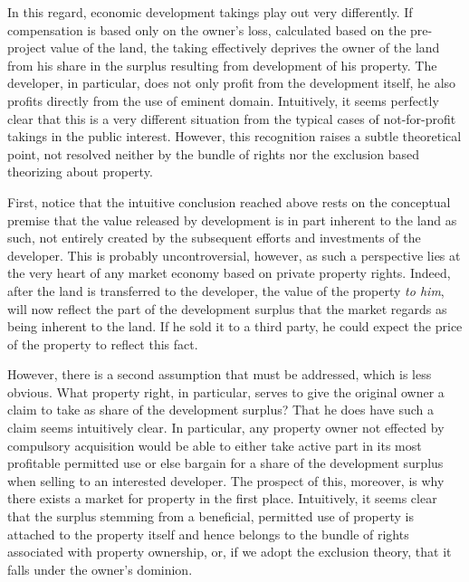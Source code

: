 In this regard, economic development takings play out very differently. If compensation is based only on the owner's loss, calculated based on the pre-project value of the land, the taking effectively deprives the owner of the land from his share in the surplus resulting from development of his property. The developer, in particular, does not only profit from the development itself, he also profits directly from the use of eminent domain. Intuitively, it seems perfectly clear that this is a very different situation from the typical cases of not-for-profit takings in the public interest. However, this recognition raises a subtle theoretical point, not resolved neither by the bundle of rights nor the exclusion based theorizing about property. 

First, notice that the intuitive conclusion reached above rests on the conceptual premise that the value released by development is in part inherent to the land as such, not entirely created by the subsequent efforts and investments of the developer. This is probably  uncontroversial, however, as such a perspective lies at the very heart of any market economy based on private property rights. Indeed, after the land is transferred to the developer, the value of the property {\it to him}, will now reflect the part of the development surplus that the market regards as being inherent to the land. If he sold it to a third party, he could expect the price of the property to reflect this fact.

However, there is a second assumption that must be addressed, which is less obvious. What property right, in particular, serves to give the original owner a claim to take as share of the development surplus? That he does have such a claim seems intuitively clear. In particular, any property owner not effected by compulsory acquisition would be able to either take active part in its most profitable permitted use or else bargain for a share of the development surplus when selling to an interested developer. The prospect of this, moreover, is why there exists a market for property in the first place. Intuitively, it seems clear that the surplus stemming from a beneficial, permitted use of property is attached to the property itself and hence belongs to the bundle of rights associated with property ownership, or, if we adopt the exclusion theory, that it falls under the owner's dominion.

